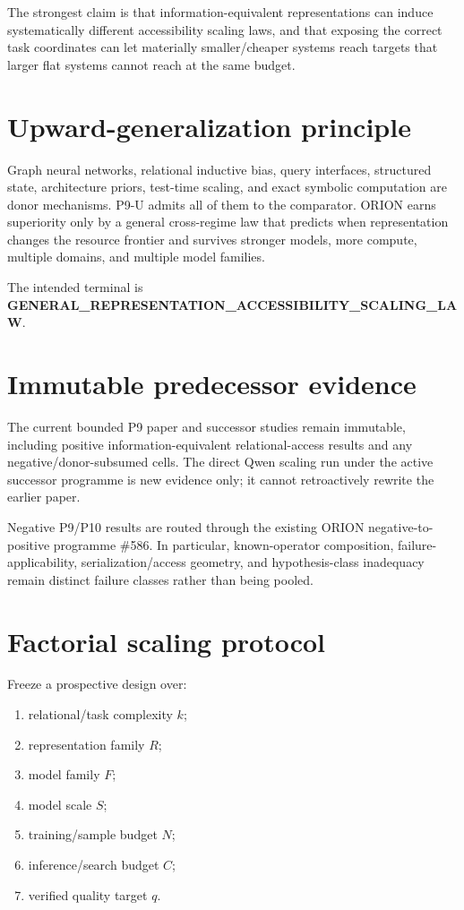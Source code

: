 \documentclass[11pt]{article}
\begin{document}
The strongest claim is that information-equivalent representations can induce systematically different accessibility scaling laws, and that exposing the correct task coordinates can let materially smaller/cheaper systems reach targets that larger flat systems cannot reach at the same budget.

\section{Upward-generalization principle}
Graph neural networks, relational inductive bias, query interfaces, structured state, architecture priors, test-time scaling, and exact symbolic computation are donor mechanisms. P9-U admits all of them to the comparator. ORION earns superiority only by a general cross-regime law that predicts when representation changes the resource frontier and survives stronger models, more compute, multiple domains, and multiple model families.

The intended terminal is \textbf{GENERAL_REPRESENTATION_ACCESSIBILITY_SCALING_LAW}.

\section{Immutable predecessor evidence}
The current bounded P9 paper and successor studies remain immutable, including positive information-equivalent relational-access results and any negative/donor-subsumed cells. The direct Qwen scaling run under the active successor programme is new evidence only; it cannot retroactively rewrite the earlier paper.

Negative P9/P10 results are routed through the existing ORION negative-to-positive programme \#586. In particular, known-operator composition, failure-applicability, serialization/access geometry, and hypothesis-class inadequacy remain distinct failure classes rather than being pooled.

\section{Factorial scaling protocol}
Freeze a prospective design over:
\begin{enumerate}
    \item relational/task complexity $k$;
    \item representation family $R$;
    \item model family $F$;
    \item model scale $S$;
    \item training/sample budget $N$;
    \item inference/search budget $C$;
    \item verified quality target $q$.
\end{enumerate}
\end{document}
